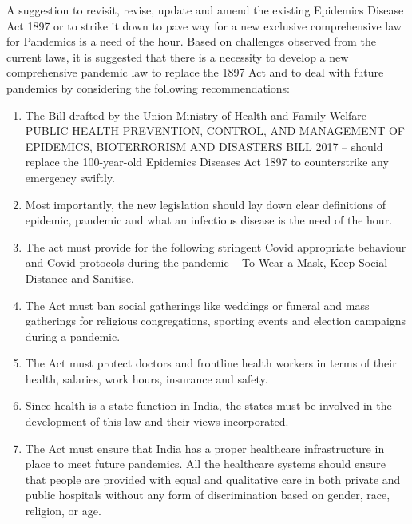 \begin{multicols}{2}
\vspace{-.1cm}


\vspace{-.1cm}

\noi
A suggestion to revisit, revise, update and amend the existing Epidemics Disease Act 1897 or
to strike it down to pave way for a new exclusive comprehensive law for Pandemics is a need
of the hour. Based on challenges observed from the current laws, it is suggested that there is a
necessity to develop a new comprehensive pandemic law to replace the 1897 Act and to deal
with future pandemics by considering the following recommendations:

\vspace{-.2cm}

\begin{enumerate}[label=$\bullet$]
\itemsep=0pt

\item The Bill drafted by the Union Ministry of Health and Family Welfare – PUBLIC HEALTH PREVENTION, CONTROL, AND MANAGEMENT OF EPIDEMICS, BIOTERRORISM AND DISASTERS BILL 2017 – should replace the 100-year-old Epidemics Diseases Act 1897 to counterstrike any emergency swiftly.

\item Most importantly, the new legislation should lay down clear definitions of epidemic, pandemic and what an infectious disease is the need of the hour.

\item The act must provide for the following stringent Covid appropriate behaviour and Covid protocols during the pandemic – To Wear a Mask, Keep Social Distance and Sanitise.

\item The Act must ban social gatherings like weddings or funeral and mass gatherings for religious congregations, sporting events and election campaigns during a pandemic.

\item The Act must protect doctors and frontline health workers in terms of their health,
salaries, work hours, insurance and safety.

\item Since health is a state function in India, the states must be involved in the
development of this law and their views incorporated.

\item The Act must ensure that India has a proper healthcare infrastructure in place to meet
future pandemics. All the healthcare systems should ensure that people are provided
with equal and qualitative care in both private and public hospitals without any form
of discrimination based on gender, race, religion, or age.


\end{enumerate}
\end{multicols}
